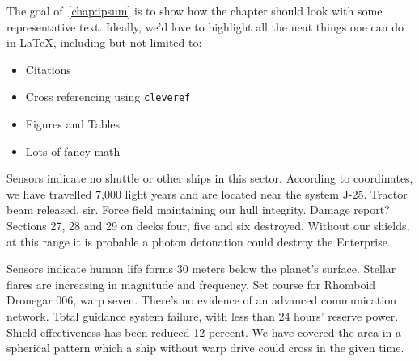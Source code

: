 The goal of~\cref{chap:ipsum} is to show how the chapter should look with some representative text. 
Ideally, we'd love to highlight all the neat things one can do in \LaTeX, including but not limited to:
\begin{itemize}
    \item Citations
    \item Cross referencing using \verb+cleveref+
    \item Figures and Tables
    \item Lots of fancy math
\end{itemize}
Sensors indicate no shuttle or other ships in this sector. According to coordinates, we have travelled 7,000 light years and are located near the system J-25. Tractor beam released, sir. Force field maintaining our hull integrity. Damage report? Sections 27, 28 and 29 on decks four, five and six destroyed. Without our shields, at this range it is probable a photon detonation could destroy the Enterprise.

Sensors indicate human life forms 30 meters below the planet's surface. Stellar flares are increasing in magnitude and frequency. Set course for Rhomboid Dronegar 006, warp seven. There's no evidence of an advanced communication network. Total guidance system failure, with less than 24 hours' reserve power. Shield effectiveness has been reduced 12 percent. We have covered the area in a spherical pattern which a ship without warp drive could cross in the given time.

